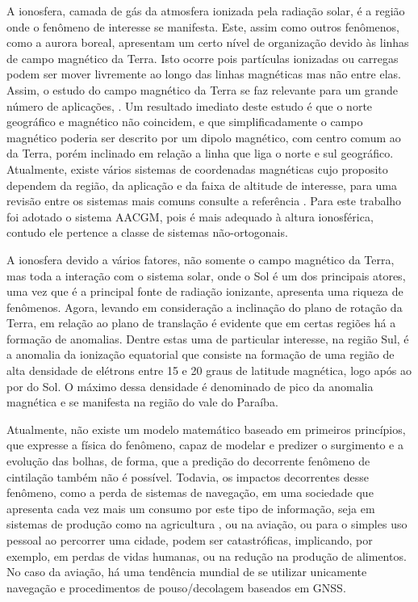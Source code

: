 A ionosfera, camada de gás da atmosfera ionizada pela radiação solar, é a região onde o fenômeno de interesse se manifesta. Este, assim como outros fenômenos, como a aurora boreal, apresentam um certo nível de organização devido às linhas de campo magnético da Terra. Isto ocorre pois partículas ionizadas ou carregas podem ser mover livremente ao longo das linhas magnéticas mas não entre elas. Assim, o estudo do campo magnético da Terra se faz relevante para um grande número de aplicações, \cite{LAUNDAL:2017}. Um resultado imediato deste estudo é que o norte geográfico e magnético não coincidem, e que simplificadamente o campo magnético poderia ser descrito por um dipolo magnético, com centro comum ao da Terra, porém inclinado em relação a linha que liga o norte e sul geográfico. Atualmente, existe vários sistemas de coordenadas magnéticas cujo proposito dependem da região, da aplicação e da faixa de altitude de interesse, para uma revisão entre os sistemas mais comuns consulte a referência \cite{LAUNDAL:2017}. Para este trabalho foi adotado o sistema AACGM, pois é mais adequado à altura ionosférica, contudo ele pertence a classe de sistemas não-ortogonais.

A ionosfera devido a vários fatores, não somente o campo magnético da Terra, mas toda a interação com o sistema solar, onde o Sol é um dos principais atores, uma vez que é a principal fonte de radiação ionizante, apresenta uma riqueza de fenômenos. Agora, levando em consideração a inclinação do plano de rotação da Terra, em relação ao plano de translação é evidente que em certas regiões há a formação de anomalias. Dentre estas uma de particular interesse, na região Sul, é a anomalia da ionização equatorial que consiste na formação de uma região de alta densidade de elétrons entre 15 e 20 graus de latitude magnética, logo após ao por do Sol. O máximo dessa densidade é denominado de pico da anomalia magnética e se manifesta na região do vale do Paraíba.

Atualmente, não existe um modelo matemático baseado em primeiros princípios, que expresse a física do fenômeno, capaz de modelar e predizer o surgimento e a evolução das bolhas, de forma, que a predição do decorrente fenômeno de cintilação também não é possível. Todavia, os impactos decorrentes desse fenômeno, como a perda de sistemas de navegação, em uma sociedade que apresenta cada vez mais um consumo por este tipo de informação, seja em sistemas de produção como na agricultura \cite{STAFFORD:2000}, ou na aviação, ou para o simples uso pessoal ao percorrer uma cidade, podem ser catastróficas, implicando, por exemplo, em perdas de vidas humanas, ou na redução na produção de alimentos. No caso da aviação, há uma tendência mundial de se utilizar unicamente navegação e procedimentos de pouso/decolagem baseados em GNSS.


